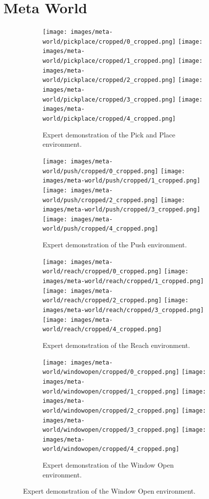 \chapter{Meta World}
\label{chapter:MetaWorld}
\begin{figure}[h]
    \centering
    \begin{subfigure}[b]{1\linewidth}
    \texttt{[image: images/meta-world/pickplace/cropped/0\_cropped.png]}
    \texttt{[image: images/meta-world/pickplace/cropped/1\_cropped.png]}
    \texttt{[image: images/meta-world/pickplace/cropped/2\_cropped.png]}
    \texttt{[image: images/meta-world/pickplace/cropped/3\_cropped.png]}
    \texttt{[image: images/meta-world/pickplace/cropped/4\_cropped.png]}
    \caption{Expert demonstration of the Pick and Place environment.}
    \label{fig:reach-environment}
    \end{subfigure}
    \begin{subfigure}[b]{1\linewidth}
        \texttt{[image: images/meta-world/push/cropped/0\_cropped.png]}
        \texttt{[image: images/meta-world/push/cropped/1\_cropped.png]}
        \texttt{[image: images/meta-world/push/cropped/2\_cropped.png]}
        \texttt{[image: images/meta-world/push/cropped/3\_cropped.png]}
        \texttt{[image: images/meta-world/push/cropped/4\_cropped.png]}
        \caption{Expert demonstration of the Push environment.}
        \label{fig:reach-environment}
    \end{subfigure}
    \begin{subfigure}[b]{1\linewidth}
        \texttt{[image: images/meta-world/reach/cropped/0\_cropped.png]}
        \texttt{[image: images/meta-world/reach/cropped/1\_cropped.png]}
        \texttt{[image: images/meta-world/reach/cropped/2\_cropped.png]}
        \texttt{[image: images/meta-world/reach/cropped/3\_cropped.png]}
        \texttt{[image: images/meta-world/reach/cropped/4\_cropped.png]}
        \caption{Expert demonstration of the Reach environment.}
        \label{fig:reach-environment}
    \end{subfigure}
    \begin{subfigure}[b]{1\linewidth}
        \texttt{[image: images/meta-world/windowopen/cropped/0\_cropped.png]}
        \texttt{[image: images/meta-world/windowopen/cropped/1\_cropped.png]}
        \texttt{[image: images/meta-world/windowopen/cropped/2\_cropped.png]}
        \texttt{[image: images/meta-world/windowopen/cropped/3\_cropped.png]}
        \texttt{[image: images/meta-world/windowopen/cropped/4\_cropped.png]}
        \caption{Expert demonstration of the Window Open environment.}

\end{subfigure}
\end{figure}
